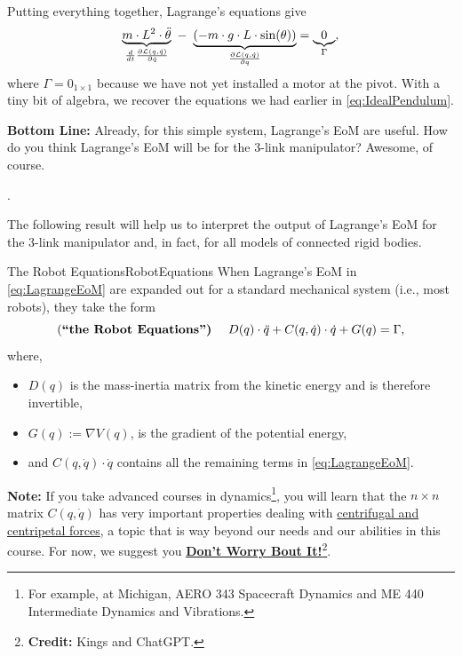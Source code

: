 Putting everything together, Lagrange's equations give  
\begin{equation}
\label{eq:DddotqPendulum}
    \underbrace{m \cdot L^2 \cdot \ddot{\theta}}_{ \frac{d}{dt} \frac{ \partial {\cal L}(q, \dot{q})}{\partial\dot{q}}}~ -~ \underbrace{\left(- m\cdot g\cdot L \cdot \sin(\theta) \right)}_{\frac{ \partial {\cal L}(q, \dot{q})}{\partial q}}
= \underbrace{0}_{\Gamma},
\end{equation}
where $\Gamma = 0_{1 \times 1}$ because we have not yet installed a motor at the pivot. With a tiny bit of algebra, we recover the equations we had earlier in \eqref{eq:IdealPendulum}.

\textbf{Bottom Line:} Already, for this simple system, Lagrange's EoM are useful. How do you think Lagrange's EoM will be for the 3-link manipulator? Awesome, of course.

\Qed. 

\bigskip

The following result will help us to interpret the output of Lagrange's EoM for the 3-link manipulator and, in fact, for all models of connected rigid bodies. 

\bigskip

\begin{propColor}{The Robot Equations}{RobotEquations}
When Lagrange's EoM in \eqref{eq:LagrangeEoM} are expanded out for a standard mechanical system (i.e., most robots), they take the form 
\begin{equation}
\label{eq:RobotEquations}
 \text{(\bf ``the Robot Equations'')}~~~~   D(q) \cdot \ddot{q} + C(q, \dot{q}) \cdot \dot{q} + G(q) = \Gamma,
\end{equation}
where,
\begin{itemize}
    \item $D(q)$ is the mass-inertia matrix from the kinetic energy and is therefore invertible,
    \item $G(q) := \nabla V(q)$, is the gradient of the potential energy,
    \item  and $C(q, \dot{q}) \cdot \dot{q}$ contains all the remaining terms in \eqref{eq:LagrangeEoM}. 
\end{itemize} 
 \vspace*{.1cm}  
\textbf{Note:} If you take advanced courses in dynamics\footnote{For example, at Michigan, AERO 343 Spacecraft Dynamics and ME 440 Intermediate Dynamics and Vibrations.}, you will learn that the $n \times n$ matrix $C(q, \dot{q})$ has very important properties dealing with \href{https://en.wikipedia.org/wiki/History_of_centrifugal_and_centripetal_forces}{centrifugal and centripetal forces}, a topic that is way beyond our needs and our abilities in this course. For now, we suggest you \href{https://www.looper.tube/?v=VbMoEM99Dn8&s=160.8&e=165.1&spd=1}{\bf Don't Worry Bout It!}\footnote{ \textbf{Credit:} Kings and ChatGPT. }. 
 \vspace*{.1cm}   
\end{propColor}

